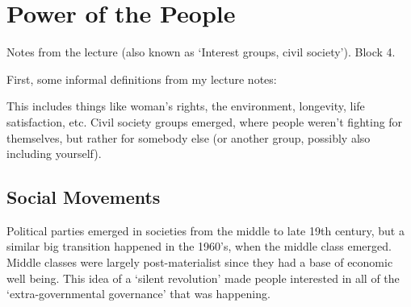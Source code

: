 \section{Power of the People}
\begin{flushright}
  \scriptsize Notes from the lecture (also known as `Interest groups,
  civil society'). Block 4.
\end{flushright}


First, some informal definitions from my lecture notes:






 This
includes things like woman's rights, the environment, longevity, life
satisfaction, etc. Civil society groups emerged, where people weren't
fighting for themselves, but rather for somebody else (or another
group, possibly also including yourself).

\subsection{Social Movements}

Political parties emerged in societies from the middle to late 19th
century, but a similar big transition happened in the 1960's, when the
middle class emerged. Middle classes were largely post-materialist
since they had a base of economic well being. This idea of a `silent
revolution' made people interested in all of the `extra-governmental
governance' that was happening.


